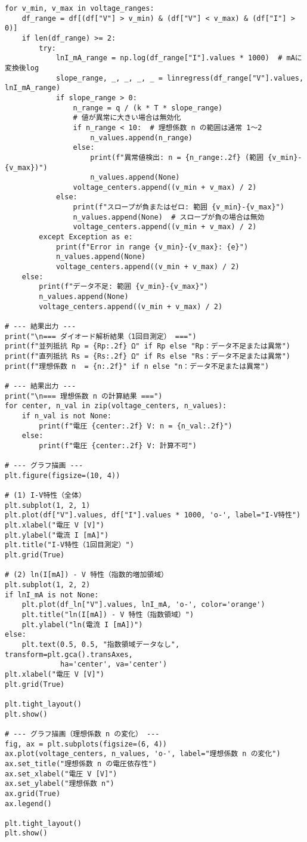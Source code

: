 \begin{lstlisting}
for v_min, v_max in voltage_ranges:
    df_range = df[(df["V"] > v_min) & (df["V"] < v_max) & (df["I"] > 0)]
    if len(df_range) >= 2:
        try:
            lnI_mA_range = np.log(df_range["I"].values * 1000)  # mAに変換後log
            slope_range, _, _, _, _ = linregress(df_range["V"].values, lnI_mA_range)
            if slope_range > 0:
                n_range = q / (k * T * slope_range)
                # 値が異常に大きい場合は無効化
                if n_range < 10:  # 理想係数 n の範囲は通常 1～2
                    n_values.append(n_range)
                else:
                    print(f"異常値検出: n = {n_range:.2f} (範囲 {v_min}-{v_max})")
                    n_values.append(None)
                voltage_centers.append((v_min + v_max) / 2)
            else:
                print(f"スロープが負またはゼロ: 範囲 {v_min}-{v_max}")
                n_values.append(None)  # スロープが負の場合は無効
                voltage_centers.append((v_min + v_max) / 2)
        except Exception as e:
            print(f"Error in range {v_min}-{v_max}: {e}")
            n_values.append(None)
            voltage_centers.append((v_min + v_max) / 2)
    else:
        print(f"データ不足: 範囲 {v_min}-{v_max}")
        n_values.append(None)
        voltage_centers.append((v_min + v_max) / 2)

# --- 結果出力 ---
print("\n=== ダイオード解析結果（1回目測定） ===")
print(f"並列抵抗 Rp = {Rp:.2f} Ω" if Rp else "Rp：データ不足または異常")
print(f"直列抵抗 Rs = {Rs:.2f} Ω" if Rs else "Rs：データ不足または異常")
print(f"理想係数 n  = {n:.2f}" if n else "n：データ不足または異常")

# --- 結果出力 ---
print("\n=== 理想係数 n の計算結果 ===")
for center, n_val in zip(voltage_centers, n_values):
    if n_val is not None:
        print(f"電圧 {center:.2f} V: n = {n_val:.2f}")
    else:
        print(f"電圧 {center:.2f} V: 計算不可")

# --- グラフ描画 ---
plt.figure(figsize=(10, 4))

# (1) I-V特性（全体）
plt.subplot(1, 2, 1)
plt.plot(df["V"].values, df["I"].values * 1000, 'o-', label="I-V特性")
plt.xlabel("電圧 V [V]")
plt.ylabel("電流 I [mA]")
plt.title("I-V特性（1回目測定）")
plt.grid(True)

# (2) ln(I[mA]) - V 特性（指数的増加領域）
plt.subplot(1, 2, 2)
if lnI_mA is not None:
    plt.plot(df_ln["V"].values, lnI_mA, 'o-', color='orange')
    plt.title("ln(I[mA]) - V 特性（指数領域）")
    plt.ylabel("ln(電流 I [mA])")
else:
    plt.text(0.5, 0.5, "指数領域データなし", transform=plt.gca().transAxes,
             ha='center', va='center')
plt.xlabel("電圧 V [V]")
plt.grid(True)

plt.tight_layout()
plt.show()

# --- グラフ描画（理想係数 n の変化） ---
fig, ax = plt.subplots(figsize=(6, 4))
ax.plot(voltage_centers, n_values, 'o-', label="理想係数 n の変化")
ax.set_title("理想係数 n の電圧依存性")
ax.set_xlabel("電圧 V [V]")
ax.set_ylabel("理想係数 n")
ax.grid(True)
ax.legend()

plt.tight_layout()
plt.show()


\end{lstlisting}
